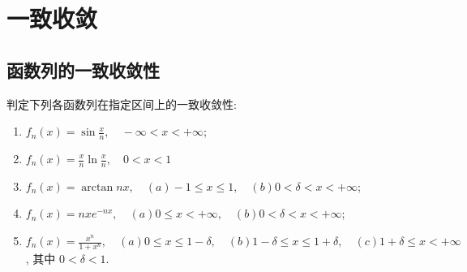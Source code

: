 \chapter{一致收敛}
\section{函数列的一致收敛性}
\begin{problem}
    判定下列各函数列在指定区间上的一致收敛性:
    \begin{enumerate}
        \item \(f_n(x) = \sin \frac{x}{n}, \quad -\infty < x < +\infty\);
        \item \(f_n(x) = \frac{x}{n} \ln \frac{x}{n}, \quad 0 < x < 1\)
        \item \(f_n(x) = \arctan nx, \quad (a) - 1 \leq x \leq 1, \quad (b) 0 <
            \delta < x < +\infty\);
        \item \(f_n(x) = nxe^{-nx}, \quad (a) 0 \leq x < +\infty, \quad (b) 0 <
            \delta < x < +\infty\);
        \item \(f_n(x) = \frac{x^n}{1 + x^n}, \quad (a) 0 \leq x \leq 1 -
                \delta, \quad (b) 1 - \delta \leq x \leq 1 + \delta,
            \quad (c) 1 + \delta \leq x < +\infty\), 其中 \(0 <
            \delta < 1\).
    \end{enumerate}
\end{problem}

